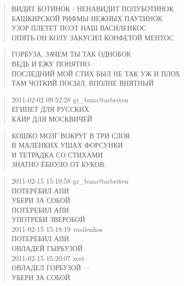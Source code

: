 \poemtitle{***}
\begin{verse}
ВИДИТ БОТИНОК - НЕНАВИДИТ ПОЛУБОТИНОК\\
БАШКИРСКОЙ РИФМЫ НЕЖНЫХ ПАУТИНОК\\
УЗОР ПЛЕТЕТ ПОЭТ НАШ ВАСИЛЕНКОС\\
ОПЯТЬ ОН КОЛУ ЗАКУСИЛ КОНФЕТОЙ МЕНТОС
\end{verse}

\poemtitle{***}
\begin{verse}
ГОРБУЗА, ЗАЧЕМ ТЫ ТАК ОДНОБОК\\
ВЕДЬ И ЕЖУ ПОНЯТНО\\
ПОСЛЕДНИЙ МОЙ СТИХ БЫЛ НЕ ТАК УЖ И ПЛОХ\\
ТАМ ЧОТКИЙ ПОСЫЛ, ВПОЛНЕ ВНЯТНЫЙ
\end{verse}

\poemtitle{***}
\begin{verse}
2011-02-02 09:52:28 gr\_buza@arbeiten\\
ЕГИПЕТ ДЛЯ РУССКИХ\\
КАИР ДЛЯ МОСКВИЧЕЙ
\end{verse}

\poemtitle{***}
\begin{verse}
КОШКО МОЗГ ВОКРУГ В ТРИ СЛОЯ\\
В МАЛЕНКИХ УШАХ ФОРСУНКИ\\
И ТЕТРАДКА СО СТИХАМИ\\
ЗНАТНО ЁБНУЛО ОТ БУКОВ.
\end{verse}

\poemtitle{***}
\begin{verse}
2011-02-15 15:10:58 gr\_buza@arbeiten\\
ПОТЕРЕБИЛ АПИ\\
УБЕРИ ЗА СОБОЙ\\
ПОТЕРЕБИЛ АПИ\\
УПОТРЕБИ ЗВЕРОБОЙ\\
2011-02-15 15:18:19 vasilenkos\\
ПОТЕРЕБИЛ АПИ\\
ОВЛАДЕЙ ГЫРБУЗОЙ\\
2011-02-15 15:20:07 zert\\
ОВЛАДЕЛ ГОРБУЗОЙ —\\
УБЕРИ ЗА СОБОЙ
\end{verse}

